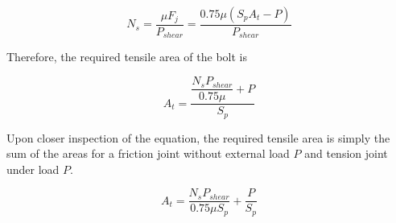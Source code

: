 \documentclass[
10pt,
a4paper,
openany,
svgnames,
]{book}
\begin{document}
\begin{equation}
  N_s = \frac{\mu F_j}{P_{shear}} = \frac{0.75\mu (S_pA_t - P)}{P_{shear}}
\end{equation}

Therefore, the required tensile area of the bolt is

\begin{equation}
  A_t = \frac{\dfrac{N_s P_{shear}}{0.75\mu } + P}{S_p}
\end{equation}

Upon closer inspection of the equation, the required tensile area is simply the sum of the areas for a friction joint without external load $P$ and tension joint under load $P$.

\begin{equation}
  A_t = \frac{N_s P_{shear}}{0.75\mu S_p } + \frac{P}{S_p}
\end{equation}
\end{document}
